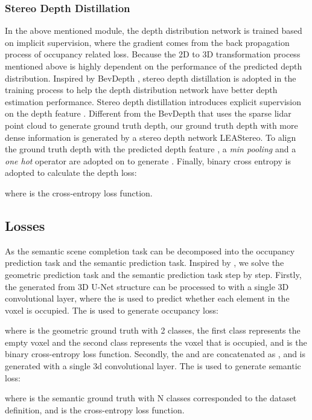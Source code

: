 \documentclass{article}
\begin{document}
	\subsubsection{Stereo Depth Distillation}
	
	In the above mentioned module, the depth distribution network  is trained based on implicit supervision, where the gradient comes from the back propagation process of occupancy related loss.
	Because the 2D to 3D transformation process mentioned above is highly dependent on the performance of the predicted depth distribution.
	Inspired by BevDepth \cite{li2022bevdepth}, stereo depth distillation is adopted in the training process to help the depth distribution network  have better depth estimation performance.
	Stereo depth distillation introduces explicit supervision on the depth feature . Different from the BevDepth that uses the sparse lidar point cloud to generate ground truth depth, our ground truth depth  with more dense information is generated by a stereo depth network LEAStereo.
	To align the ground truth depth with the predicted depth feature , a \textit{min pooling} and a \textit{one hot} operator are adopted on  to generate .
	Finally, binary cross entropy is adopted to calculate the depth loss:
	
	where  is the cross-entropy loss function.
	
	
	\subsection{Losses}
	\label{sectionGeometricSemanticDecouplingModule}
	As the semantic scene completion task can be decomposed into the occupancy prediction task and the semantic prediction task.
	Inspired by \cite{chen2020real}, we solve the geometric prediction task and the semantic prediction task step by step.
	Firstly, the  generated from 3D U-Net structure can be processed to  with a single 3D convolutional layer,
	where the  is used to predict whether each element in the voxel is occupied.
	The  is used to generate occupancy loss:
	
	where  is the geometric ground truth with 2 classes, the first class represents the empty voxel and the second class represents the voxel that is occupied, and  is the binary cross-entropy loss function.
	Secondly, the  and  are concatenated as , and  is generated with a single 3d convolutional layer.
	The  is used to generate semantic loss:
	
	where  is the semantic ground truth with N classes corresponded to the dataset definition, and  is the cross-entropy loss function.
	
\end{document}

